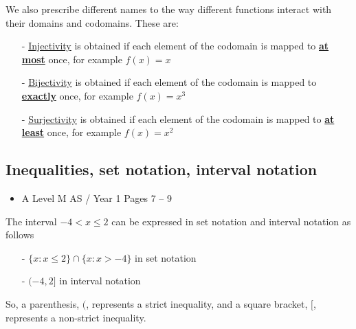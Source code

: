 \documentclass[11pt, a4paper]{article}
\begin{document}
We also prescribe different names to the way different functions interact with their domains and codomains. These are:
\begin{itemize}
\item[-] \underline{Injectivity} is obtained if each element of the codomain is mapped to \textbf{\underline{at most}} once, for example $f(x)=x$
\item[-] \underline{Bijectivity} is obtained if each element of the codomain is mapped to \textbf{\underline{exactly}} once, for example $f(x)=x^{3}$
\item[-] \underline{Surjectivity} is obtained if each element of the codomain is mapped to \textbf{\underline{at least}} once, for example $f(x)=x^{2}$
\end{itemize}
\vspace{0.5cm}


\subsection{Inequalities, set notation, interval notation}
\begin{itemize}
\item A Level M AS / Year 1 \hspace{1cm} \phantom{ } Pages 7 -- 9
\end{itemize}
The interval $-4<x\leq2$ can be expressed in set notation and interval notation as follows
\begin{itemize}
\item[-] $\{x:x\leq2\}\cap\{x:x>-4\}$ in set notation
\item[-] $(-4,2]$ in interval notation
\end{itemize}
So, a parenthesis, $($, represents a strict inequality, and a square bracket, $[$, represents a non-strict inequality.
\vspace{0.5cm}
\end{document}
